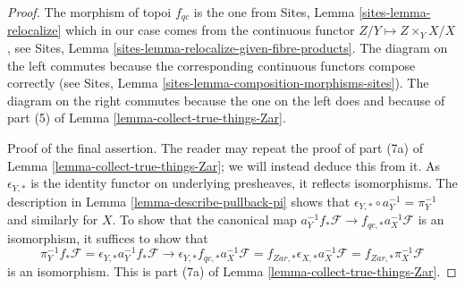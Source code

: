 \documentclass[10pt,a4paper]{amsart}
\theoremstyle{plain}
\theoremstyle{definition}
\theoremstyle{remark}
\numberwithin{equation}{subsection}
\begin{document}
\begin{proof}
The morphism of topoi $f_{qc}$ is the one from
Sites, Lemma \ref{sites-lemma-relocalize}
which in our case comes from the continuous functor
$Z/Y \mapsto Z \times_Y X/X$, see
Sites, Lemma \ref{sites-lemma-relocalize-given-fibre-products}.
The diagram on the left commutes because the corresponding
continuous functors compose correctly
(see Sites, Lemma \ref{sites-lemma-composition-morphisms-sites}).
The diagram on the right commutes because the one on the left does
and because of part (5) of Lemma \ref{lemma-collect-true-things-Zar}.

\medskip\noindent
Proof of the final assertion. The reader may repeat the proof of part (7a) of
Lemma \ref{lemma-collect-true-things-Zar}; we will instead deduce this from it.
As $\epsilon_{Y, *}$ is the identity functor on underlying presheaves,
it reflects isomorphisms. The description
in Lemma \ref{lemma-describe-pullback-pi}
shows that $\epsilon_{Y, *} \circ a_Y^{-1} = \pi_Y^{-1}$
and similarly for $X$. To show that the canonical map
$a_Y^{-1}f_*\mathcal{F} \to f_{qc, *}a_X^{-1}\mathcal{F}$
is an isomorphism, it suffices to show that
$$
\pi_Y^{-1}f_*\mathcal{F} =
\epsilon_{Y, *}a_Y^{-1}f_*\mathcal{F} \to
\epsilon_{Y, *}f_{qc, *}a_X^{-1}\mathcal{F} =
f_{Zar, *}\epsilon_{X, *}a_X^{-1}\mathcal{F} =
f_{Zar, *}\pi_X^{-1}\mathcal{F}
$$
is an isomorphism. This is part
(7a) of Lemma \ref{lemma-collect-true-things-Zar}.
\end{proof}
\end{document}
